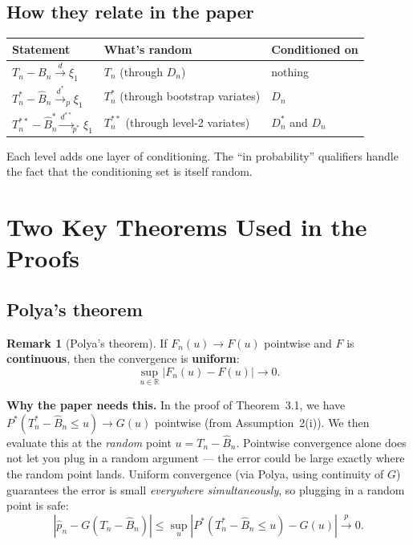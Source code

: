 \documentclass[11pt]{article}
\theoremstyle{definition}
\newtheorem*{remark}{Remark}
\newcommand{\R}{\mathbb{R}}
\begin{document}
\subsection{How they relate in the paper}
 
\begin{center}
\begin{tabular}{@{}lll@{}}
  \toprule
  Statement & What's random & Conditioned on \\
  \midrule
  $T_n - B_n \xrightarrow{d} \xi_1$
    & $T_n$ (through $D_n$)
    & nothing \\[4pt]
  $T_n^* - \hat B_n \xrightarrow{d^*}_p \xi_1$
    & $T_n^*$ (through bootstrap variates)
    & $D_n$ \\[4pt]
  $T_n^{**} - \hat B_n^* \xrightarrow{d^{**}}_{p^*} \xi_1$
    & $T_n^{**}$ (through level-2 variates)
    & $D_n^*$ and $D_n$ \\
  \bottomrule
\end{tabular}
\end{center}
 
Each level adds one layer of conditioning. The ``in probability''
qualifiers handle the fact that the conditioning set is itself random.
 
\section{Two Key Theorems Used in the Proofs}
 
\subsection{Polya's theorem}
 
\begin{remark}[Polya's theorem]
  If $F_n(u) \to F(u)$ pointwise and $F$ is \textbf{continuous}, then
  the convergence is \textbf{uniform}:
  \[
    \sup_{u \in \R} |F_n(u) - F(u)| \to 0.
  \]
\end{remark}
 
\textbf{Why the paper needs this.}
In the proof of Theorem~3.1, we have
$P^*(T_n^* - \hat B_n \le u) \to G(u)$ pointwise (from Assumption~2(i)).
We then evaluate this at the \textit{random} point $u = T_n - \hat B_n$.
Pointwise convergence alone does not let you plug in a random argument ---
the error could be large exactly where the random point lands.
Uniform convergence (via Polya, using continuity of $G$) guarantees the
error is small \textit{everywhere simultaneously}, so plugging in a
random point is safe:
\[
  |\hat p_n - G(T_n - \hat B_n)|
  \le \sup_u |P^*(T_n^* - \hat B_n \le u) - G(u)|
  \xrightarrow{p} 0.
\]
 
\end{document}
